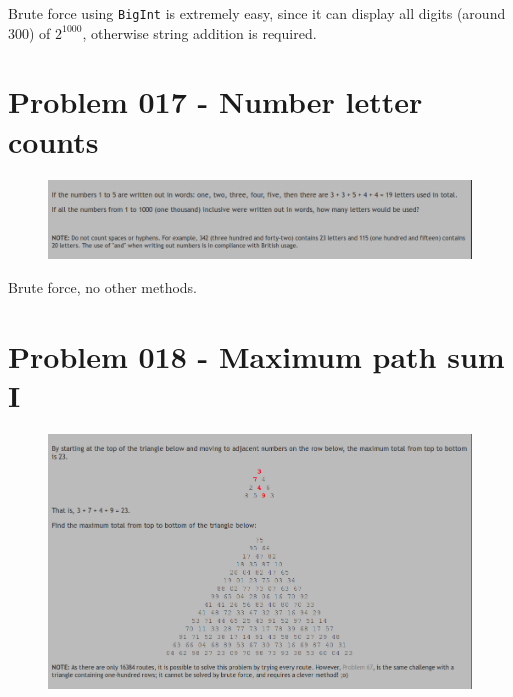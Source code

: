 \begin{sol}
Brute force using \texttt{BigInt} is extremely easy, since it can display all digits (around 300) of $2^{1000}$, otherwise string addition is required.
\end{sol}
\section{Problem 017 - Number letter counts}
\begin{prob}
	\begin{figure}[htb!]
		\begin{center}
			\includegraphics[scale = 0.4]{pic/017.png}
		\end{center}
	\end{figure}
\end{prob}
\begin{sol}
Brute force, no other methods.
\end{sol}
\section{Problem 018 - Maximum path sum I}
\begin{prob}
	\begin{figure}[htb!]
		\begin{center}
			\includegraphics[scale = 0.4]{pic/018.png}
		\end{center}
	\end{figure}
\end{prob}

